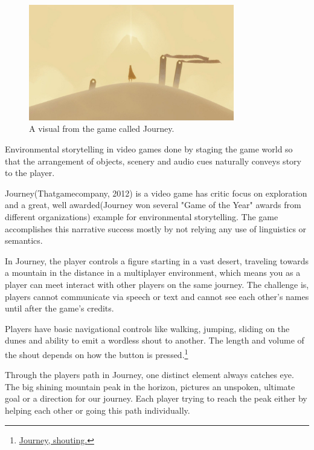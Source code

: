             \begin{figure}[H]
                \centering
                \includegraphics[width=0.8\textwidth]{images/journey.jpg}
                \caption{A visual from the game called Journey.}
                \label{fig:JOURNEY}
            \end{figure}

            Environmental storytelling in video games done by staging the game world so that the arrangement of objects, scenery and audio cues naturally conveys story to the player\cite{BioShock_Infinite}.\par

            Journey(Thatgamecompany, 2012) is a video game has critic focus on exploration and a great, well awarded(Journey won several "Game of the Year" awards from different organizations) example for environmental storytelling. The game accomplishes this narrative success mostly by not relying any use of linguistics or semantics.\par

            In Journey, the player controls a figure starting in a vast desert, traveling towards a mountain in the distance in a multiplayer environment, which means you as a player can meet interact with other players on the same journey. The challenge is, players cannot communicate via speech or text and cannot see each other's names until after the game's credits.\par

            Players have basic navigational controls like walking, jumping, sliding on the dunes and ability to emit a wordless shout to another. The length and volume of the shout depends on how the button is pressed.\footnote{\href{https://youtube.com/clip/UgkxMXBXc4aZmHuOL2f3PUoEVQ57Og5Suyks/}{Journey, shouting.}}\par

            Through the players path in Journey, one distinct element always catches eye. The big shining mountain peak in the horizon, pictures an unspoken, ultimate goal or a direction for our journey. Each player trying to reach the peak either by helping each other or going this path individually.\par


